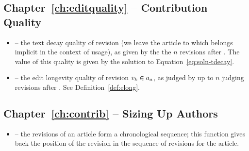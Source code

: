 \subsection{Chapter~\ref{ch:editquality} -- Contribution Quality}

\begin{itemize}

\item {} -- the text decay quality of revision
     (we leave the article to which  belongs
    implicit in the context of usage), as given by the the $n$ revisions
    after .
    The value of this quality is given by the solution to
    Equation~\ref{eq:soln-tdecay}.

\item {} -- the edit longevity quality of
    revision $v_{k} \in a_{a}$, as judged by up to
    $n$ judging revisions after .
    See Definition~\ref{def:elong}.

\end{itemize}

\subsection{Chapter~\ref{ch:contrib} -- Sizing Up Authors}

\begin{itemize}

\item {} -- the revisions of an article form a
    chronological sequence; this function gives back the position
    of the revision in the sequence of revisions for the article.

\end{itemize}

\renewcommand{\labelitemi}{$\bullet$}




